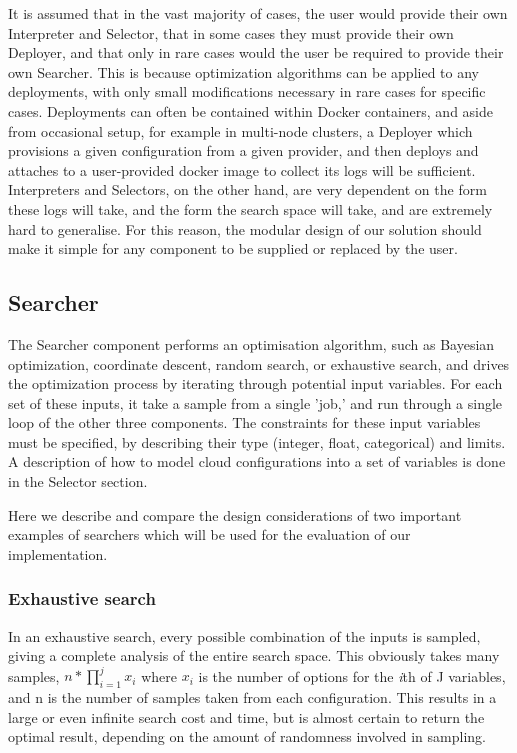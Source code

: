 \documentclass{article}
\begin{document}
It is assumed that in the vast majority of cases, the user would provide their own Interpreter and Selector, that in some cases they must provide their own Deployer, and that only in rare cases would the user be required to provide their own Searcher. This is because optimization algorithms can be applied to any deployments, with only small modifications necessary in rare cases for specific cases. Deployments can often be contained within Docker containers, and aside from occasional setup, for example in multi-node clusters, a Deployer which provisions a given configuration from a given provider, and then deploys and attaches to a user-provided docker image to collect its logs will be sufficient. Interpreters and Selectors, on the other hand, are very dependent on the form these logs will take, and the form the search space will take, and are extremely hard to generalise. For this reason, the modular design of our solution should make it simple for any component to be supplied or replaced by the user. 

\subsection{Searcher}
The Searcher component performs an optimisation algorithm, such as Bayesian optimization, coordinate descent, random search, or exhaustive search, and drives the optimization process by iterating through potential input variables. For each set of these inputs, it take a sample from a single 'job,' and run through a single loop of the other three components. The constraints for these input variables must be specified, by describing their type (integer, float, categorical) and limits. A description of how to model cloud configurations into a set of variables is done in the Selector section.

Here we describe and compare the design considerations of two important examples of searchers which will be used for the evaluation of our implementation.

\subsubsection{Exhaustive search}
In an exhaustive search, every possible combination of the inputs is sampled, giving a complete analysis of the entire search space. This obviously takes many samples, $n * \prod_{i=1}^{j} x_{i}$ where $x_{i}$ is the number of options for the \textit{i}th of J variables, and n is the number of samples taken from each configuration. This results in a large or even infinite search cost and time, but is almost certain to return the optimal result, depending on the amount of randomness involved in sampling.
\end{document}
